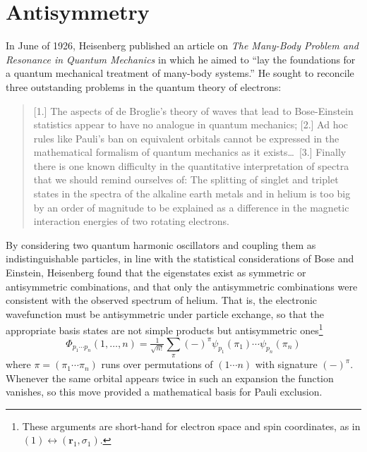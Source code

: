 \section{Antisymmetry}

In June of 1926, Heisenberg published an article on {\itshape The Many-Body
Problem and Resonance in Quantum Mechanics} in which he aimed to ``lay the
foundations for a quantum mechanical treatment of many-body
systems.''\cite{Heisenberg:1926p411}
He sought to reconcile three outstanding problems in the quantum theory of
electrons:
\begin{quote}
    [1.] The aspects of de Broglie's theory of waves that lead to Bose-Einstein
    statistics appear to have no analogue in quantum mechanics;
    [2.] Ad hoc rules like Pauli's ban on equivalent orbitals cannot be
    expressed in the mathematical formalism of quantum mechanics as it
    exists\dots\ 
    [3.] Finally there is one known difficulty in the quantitative
    interpretation of spectra that we should remind ourselves of:
    The splitting of singlet and triplet states in the spectra of the alkaline
    earth metals and in helium is too big by an order of magnitude to be
    explained as a difference in the magnetic interaction energies of two
    rotating electrons.\cite{Heisenberg:1926p411}
\end{quote}
By considering two quantum harmonic oscillators and coupling them as
indistinguishable particles, in line with the statistical considerations of Bose
and Einstein,\cite{Bose:1924p178,Einstein:1924p261,Einstein:1925p3} Heisenberg
found that the eigenstates exist as symmetric or antisymmetric combinations, and
that only the antisymmetric combinations were consistent with the observed
spectrum of helium.
That is, the electronic wavefunction must be antisymmetric under particle
exchange, so that the appropriate basis states are not simple products but
antisymmetric ones\footnote{%
    These arguments are short-hand for electron space and spin coordinates, as
    in \((1) \leftrightarrow (\mathbf{r}_1, \sigma_1)\).
}
\begin{equation}
    \Phi_{p_1\cdots p_n}(1, \ldots, n)
    =
    \tfrac{1}{\sqrt{n!}}
    \sum_{\pi}
    (-)^\pi
    \psi_{p_1}(\pi_1)
    \cdots
    \psi_{p_n}(\pi_n)
\end{equation}
where \(\pi=(\pi_1\cdots \pi_n)\) runs over permutations of \((1\cdots n)\) with
signature \((-)^\pi\).
Whenever the same orbital appears twice in such an expansion the function
vanishes, so this move provided a mathematical basis for Pauli exclusion.

